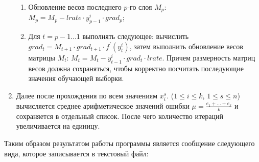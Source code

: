 \documentclass[bachelor, och, otchet]{template}
\begin{document}
\begin{enumerate}
            \begin{enumerate}
                \item Обновление весов последнего $p$-го слоя $M_p$: \\$M_p = M_p - lrate \cdot y_{p - 1}^i \cdot grad_p$;
                \item Для $t = p - 1 \dots 1$ выполнять следующее: вычислить \\$grad_t = M_{t + 1} \cdot grad_{t + 1} \cdot f^{'}(y_{t}^i)$,
                затем выполнить обновление весов матрицы $M_t$: $M_t = M_t - y_{t-1}^i \cdot grad_t \cdot lrate$. Причем размерность матриц весов
                должна сохраняться, чтобы корректно посчитать последующие значения обучающей выборки.
            \end{enumerate}
            \item Далее после прохождения по всем значениям $x_i^s$. ($1 \leq i \leq k$, $1 \leq s \leq n$) вычисляется среднее арифметическое значений
            ошибки $\mu = \frac{e_1 + \dots + e_k}{k}$ и сохраняется в отдельный список. После чего количество итераций увеличивается на единицу. 
        \end{enumerate}

        Таким образом результатом работы программы является сообщение следующего вида, которое записывается в текстовый файл:
\end{document}
